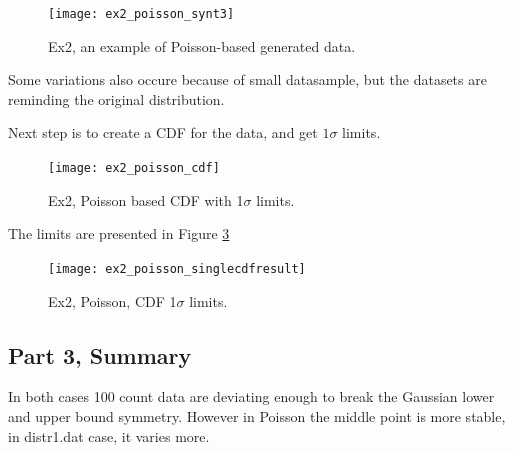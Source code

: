 \documentclass{article}
\begin{document}
\begin{figure}[!hbt]
	\centering
	\texttt{[image: ex2\_poisson\_synt3]}
	\caption{Ex2, an example of Poisson-based generated data.}
	\label{fig:ex2_poisson_synt3}
\end{figure}

Some variations also occure because of small datasample, but the datasets are reminding the original distribution.


Next step is to create a CDF for the data, and get $1 \sigma$ limits.
\begin{figure}[!hbt]
	\centering
	\texttt{[image: ex2\_poisson\_cdf]}
	\caption{Ex2, Poisson based CDF with 1$\sigma$ limits.}
	\label{fig:ex2_poisson_cdf}
\end{figure}

The limits are presented in Figure \ref{fig:ex2_poisson_singlecdfresult}

\begin{figure}[!hbt]
	\centering
	\texttt{[image: ex2\_poisson\_singlecdfresult]}
	\caption{Ex2, Poisson, CDF 1$\sigma$ limits.}
	\label{fig:ex2_poisson_singlecdfresult}
\end{figure}


\clearpage
\subsection*{Part 3, Summary}
In both cases 100 count data are deviating enough to break the Gaussian lower and upper bound symmetry. However in Poisson the middle point is more stable, in distr1.dat case, it varies more.
\end{document}
